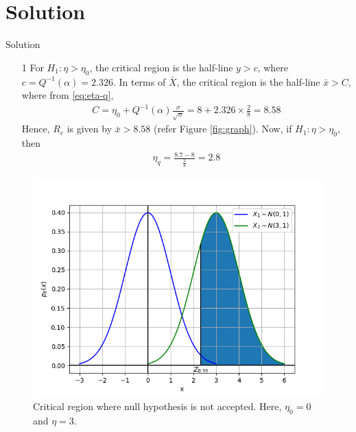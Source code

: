 \documentclass{beamer}
\begin{document}
\section{Solution}
\begin{frame}{Solution}
	\begin{enumerate}
		\item[1] For $H_1: \eta > \eta_0$, the critical region is the half-line $y > c$, where $c = Q^{-1}(\alpha) = 2.326$. In terms of $\bar{X}$, the critical region is the half-line $\bar{x} > C$, where from \eqref{eq:eta-q},
			\begin{align}
				C = \eta_0 + Q^{-1}(\alpha)\frac{\sigma}{\sqrt{n}} = 8 + 2.326 \times \frac{2}{8} = 8.58
				\label{eq:r-c}
			\end{align}
			Hence, $R_c$ is given by $\bar{x} > 8.58$ (refer Figure \eqref{fig:graph}). Now, if $H_1: \eta > \eta_0$, then
			\begin{align}
				\eta_q = \frac{8.7 - 8}{\frac{2}{8}} = 2.8
				\label{eq:new-eta}
			\end{align}
	\end{enumerate}
\end{frame}

\begin{frame}
	\begin{figure}
		\centering
		\includegraphics[height=0.8\textheight]{figs/14_1.png}
		\caption{Critical region where null hypothesis is not accepted. Here, $\eta_0 = 0$ and $\eta = 3$.}
		\label{fig:graph}
	\end{figure}
\end{frame}
\end{document}
